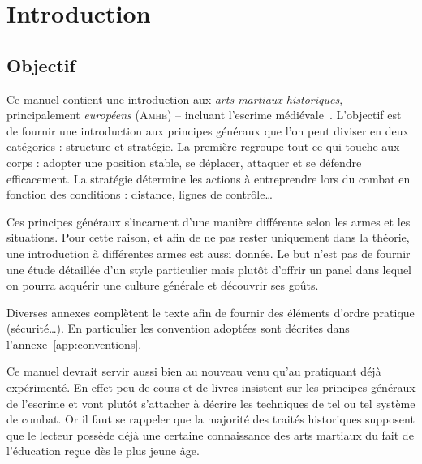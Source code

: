 \chapter{Introduction}


\section{Objectif}



Ce manuel contient une introduction aux \emph{arts martiaux historiques}, principalement \emph{européens} (\textsc{Amhe}) -- incluant l'escrime médiévale~\footnotemark{}.
L'objectif est de fournir une introduction aux principes généraux que l'on peut diviser en deux catégories : structure et stratégie.
La première regroupe tout ce qui touche aux corps : adopter une position stable, se déplacer, attaquer et se défendre efficacement.
La stratégie détermine les actions à entreprendre lors du combat en fonction des conditions : distance, lignes de contrôle…

Ces principes généraux s'incarnent d'une manière différente selon les armes et les situations.
Pour cette raison, et afin de ne pas rester uniquement dans la théorie, une introduction à différentes armes est aussi donnée.
Le but n'est pas de fournir une étude détaillée d'un style particulier mais plutôt d'offrir un panel dans lequel on pourra acquérir une culture générale et découvrir ses goûts.

Diverses annexes complètent le texte afin de fournir des éléments d'ordre pratique (sécurité…).
En particulier les convention adoptées sont décrites dans l'annexe~\ref{app:conventions}.

Ce manuel devrait servir aussi bien au nouveau venu qu'au pratiquant déjà expérimenté.
En effet peu de cours et de livres insistent sur les principes généraux de l'escrime et vont plutôt s'attacher à décrire les techniques de tel ou tel système de combat.
Or il faut se rappeler que la majorité des traités historiques supposent que le lecteur possède déjà une certaine connaissance des arts martiaux du fait de l'éducation reçue dès le plus jeune âge.



